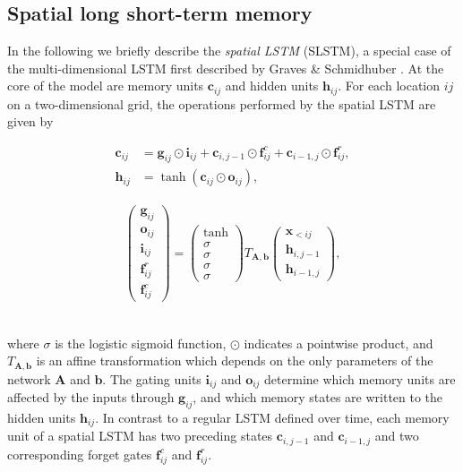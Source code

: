 \documentclass{article}
\begin{document}
		\subsection{Spatial long short-term memory}
		In the following we briefly describe the \textit{spatial LSTM} (SLSTM), a special case of the
		multi-dimensional LSTM first described by Graves \& Schmidhuber \cite{Graves:2009}.
		At the core of the model are memory units $\mathbf{c}_{ij}$ and hidden units
		$\mathbf{h}_{ij}$. For each location $ij$ on a two-dimensional grid, the operations
		performed by the spatial LSTM are given by \\
		\begin{minipage}{0.5\textwidth}
			\begin{align*}
				\mathbf{c}_{ij} &=
					\mathbf{g}_{ij} \odot \mathbf{i}_{ij}
					+ \mathbf{c}_{i,j - 1} \odot \mathbf{f}_{ij}^c
					+ \mathbf{c}_{i - 1,j} \odot \mathbf{f}_{ij}^r, \\
				\mathbf{h}_{ij} &= \tanh\left( \mathbf{c}_{ij} \odot \mathbf{o}_{ij} \right),
			\end{align*}
		\end{minipage}
		\begin{minipage}{0.5\textwidth}
			\begin{align}
				\begin{pmatrix}
					\mathbf{g}_{ij} \\
					\mathbf{o}_{ij} \\
					\mathbf{i}_{ij} \\
					\mathbf{f}_{ij}^r \\
					\mathbf{f}_{ij}^c
				\end{pmatrix}
				=
				\begin{pmatrix}
					\tanh \\
					\sigma \\
					\sigma \\
					\sigma \\
					\sigma
				\end{pmatrix}
				T_{\mathbf{A},\mathbf{b}}
				\begin{pmatrix}
					\mathbf{x}_{<ij} \\
					\mathbf{h}_{i,j - 1} \\
					\mathbf{h}_{i - 1,j}
				\end{pmatrix},
				\label{eq:slstm}
			\end{align}
		\end{minipage} \\[.4cm]
		where $\sigma$ is the logistic sigmoid function, $\odot$ indicates a pointwise product,
		and $T_{\mathbf{A},\mathbf{b}}$ is an affine transformation which depends on the only
		parameters of the network $\mathbf{A}$ and $\mathbf{b}$. The gating units $\mathbf{i}_{ij}$ and $\mathbf{o}_{ij}$
		determine which memory units are affected by the inputs through $\mathbf{g}_{ij}$, and which memory states
		are written to the hidden units $\mathbf{h}_{ij}$. In contrast to
		a regular LSTM defined over time, each memory unit of a spatial LSTM has two preceding states
		$\mathbf{c}_{i,j-1}$ and $\mathbf{c}_{i-1,j}$ and two corresponding forget gates
		$\mathbf{f}_{ij}^c$ and $\mathbf{f}_{ij}^r$.
\end{document}
